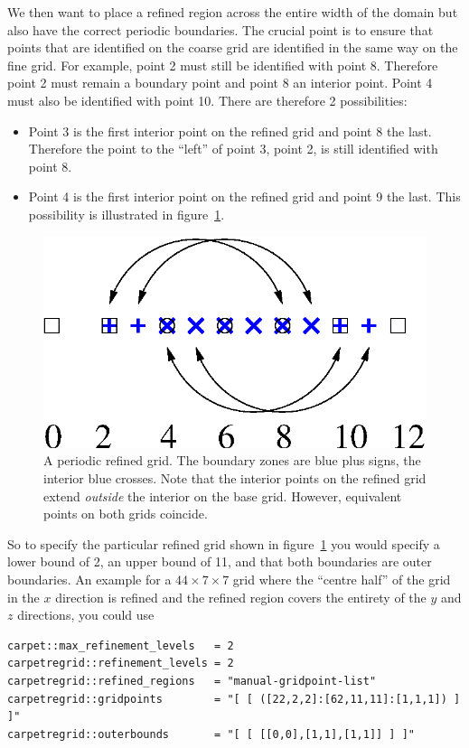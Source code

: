 \begin{enumerate}
  We then want to place a refined region across the entire width of
  the domain but also have the correct periodic boundaries. The
  crucial point is to ensure that points that are identified on the
  coarse grid are identified in the same way on the fine grid. For
  example, point 2 must still be identified with point 8. Therefore
  point 2 must remain a boundary point and point 8 an interior
  point. Point 4 must also be identified with point 10. There are
  therefore 2 possibilities:
  \begin{itemize}
  \item Point 3 is the first interior point on the refined grid and
    point 8 the last. Therefore the point to the ``left'' of point 3,
    point 2, is still identified with point 8.
  \item Point 4 is the first interior point on the refined grid and
    point 9 the last. This possibility is illustrated in
    figure~\ref{fig:Periodic2}.
  \end{itemize}
  \begin{figure}[htbp]
    \begin{center}
      \includegraphics[scale=0.5]{Periodic2.eps}
      \caption{A periodic refined grid. The boundary zones are blue
        plus signs, the interior blue crosses. Note that the interior
        points on the refined grid extend \textit{outside} the
        interior on the base grid. However, equivalent points on both
        grids coincide.}
      \label{fig:Periodic2}
    \end{center}
  \end{figure}
  
  So to specify the particular refined grid shown in
  figure~\ref{fig:Periodic2} you would specify a lower bound of 2, an
  upper bound of 11, and that both boundaries are outer boundaries. An
  example for a $44 \times 7 \times 7$ grid where the ``centre half''
  of the grid in the $x$ direction is refined and the refined region
  covers the entirety of the $y$ and $z$ directions, you could use
\begin{verbatim}
carpet::max_refinement_levels   = 2
carpetregrid::refinement_levels = 2
carpetregrid::refined_regions   = "manual-gridpoint-list"
carpetregrid::gridpoints        = "[ [ ([22,2,2]:[62,11,11]:[1,1,1]) ] ]"
carpetregrid::outerbounds       = "[ [ [[0,0],[1,1],[1,1]] ] ]"
\end{verbatim}

\end{enumerate}

